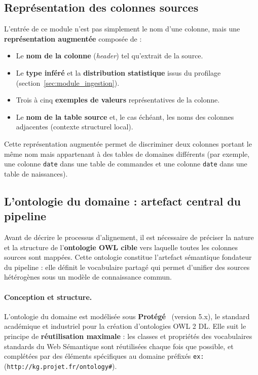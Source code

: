 \subsection{Représentation des colonnes sources}

L'entrée de ce module n'est pas simplement le nom d'une colonne, mais une
\textbf{représentation augmentée} composée de :
\begin{itemize}
    \item Le \textbf{nom de la colonne} (\textit{header}) tel qu'extrait de
          la source.
    \item Le \textbf{type inféré} et la \textbf{distribution statistique} issus
          du profilage (section~\ref{sec:module_ingestion}).
    \item Trois à cinq \textbf{exemples de valeurs} représentatives de la colonne.
    \item Le \textbf{nom de la table source} et, le cas échéant, les noms des
          colonnes adjacentes (contexte structurel local).
\end{itemize}
Cette représentation augmentée permet de discriminer deux colonnes portant le
même nom mais appartenant à des tables de domaines différents (par exemple,
une colonne \texttt{date} dans une table de commandes et une colonne \texttt{date}
dans une table de naissances).

\subsection{L'ontologie du domaine : artefact central du pipeline}
\label{subsec:ontologie}

Avant de décrire le processus d'alignement, il est nécessaire
de préciser la nature et la structure de l'\textbf{ontologie OWL
cible} vers laquelle toutes les colonnes sources sont mappées.
Cette ontologie constitue l'artefact sémantique fondateur du
pipeline : elle définit le vocabulaire partagé qui permet d'unifier
des sources hétérogènes sous un modèle de connaissance commun.

\paragraph{Conception et structure.}
L'ontologie du domaine est modélisée sous
\textbf{Protégé}~\cite{musen2015protege} (version 5.x),
le standard académique et industriel pour la création d'ontologies
OWL 2 DL.
Elle suit le principe de \textbf{réutilisation maximale} :
les classes et propriétés des vocabulaires standards du Web
Sémantique sont réutilisées chaque fois que possible, et
complétées par des éléments spécifiques au domaine préfixés
\texttt{ex:} (\texttt{http://kg.projet.fr/ontology\#}).

